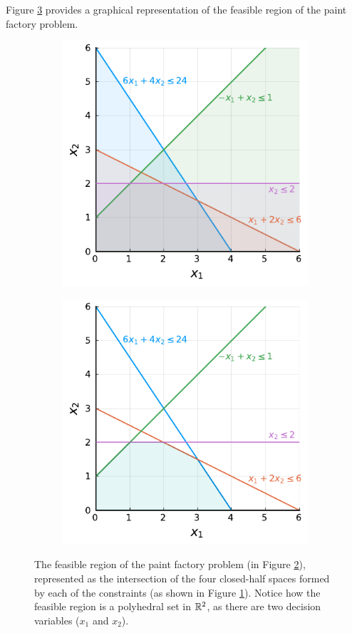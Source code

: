 Figure \ref{p1c1:fig:feasible_region_plot} provides a graphical representation of the feasible region of the paint factory problem. 
%
\begin{figure}[h]
	\begin{subfigure}{0.45\textwidth}
		\includegraphics[scale=0.99]{part_1/chapter_1/figures/figure3_c4.pdf}	
		\caption{} \label{p1c1:fig:fig3a}
	\end{subfigure}
	\begin{subfigure}{0.45\textwidth}
		\includegraphics[scale=0.99]{part_1/chapter_1/figures/figure3_c5.pdf}
		\caption{} \label{p1c1:fig:fig3b}		
	\end{subfigure}
	\caption{The feasible region of the paint factory problem (in Figure \ref{p1c1:fig:fig3b}), represented as the intersection of the four closed-half spaces formed by each of the constraints (as shown in Figure \ref{p1c1:fig:fig3a}). Notice how the feasible region is a polyhedral set in $\mathbb{R}^2$, as there are two decision variables ($x_1$ and $x_2$).} \label{p1c1:fig:feasible_region_plot}	
\end{figure}
%

